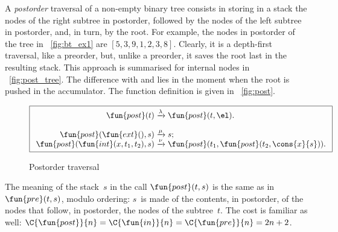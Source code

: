 A \emph{postorder} traversal of a
non\hyp{}empty binary tree consists in storing in a stack the nodes of
the right subtree in postorder, followed by the nodes of the left
subtree in postorder, and, in turn, by the root. For example, the
nodes in postorder of the tree in \fig~\vref{fig:bt_ex1} are
\([5,3,9,1,2,3,8]\). Clearly, it is a depth\hyp{}first
traversal, like a preorder,
but, unlike a preorder, it saves the root last in the resulting
stack. This approach is summarised for internal nodes in
\fig~\vref{fig:post_tree}. The difference with
 and 
lies in the moment when the root is pushed in the accumulator. The
function definition is given in \fig~\vref{fig:post}.
\begin{figure}
\begin{equation*}
\boxed{
\begin{array}{r@{\;}c@{\;}l}
\fun{post}(t) & \xrightarrow{\lambda} & \fun{post}(t,\el).\\
\\
\fun{post}(\fun{ext}(),s) & \xrightarrow{\smash{\mu}} & s;\\
\fun{post}(\fun{int}(x,t_1,t_2),s)
  & \xrightarrow{\smash{\nu}}
  & \fun{post}(t_1,\fun{post}(t_2,\cons{x}{s})).
\end{array}}
\end{equation*}
\caption{Postorder traversal}
\label{fig:post}
\end{figure}
The meaning of the stack~\(s\) in the call
\(\fun{post}(t,s)\)
is the same as in \(\fun{pre}(t,s)\), modulo ordering: \(s\)~is made
of the contents, in postorder, of the nodes that follow, in postorder,
the nodes of the subtree~\(t\). The cost is familiar as well:
\(\C{\fun{post}}{n} = \C{\fun{in}}{n} = \C{\fun{pre}}{n} = 2n +
2\).

